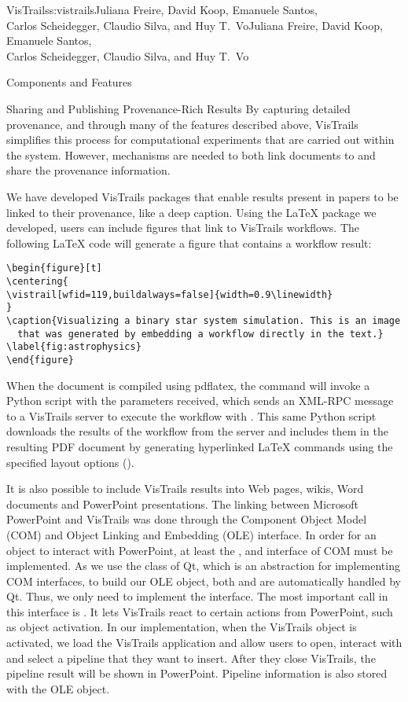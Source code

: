 \begin{aosachaptertoc}{VisTrails}{s:vistrails}{Juliana Freire, David Koop, Emanuele Santos, \\ Carlos Scheidegger, Claudio Silva, and Huy T.\ Vo}{Juliana Freire, David Koop, Emanuele Santos, \\ \hspace*{0.9cm} Carlos Scheidegger, Claudio Silva, and Huy T.\ Vo}
\begin{aosasect1}{Components and Features}
\begin{aosasect2}{Sharing and Publishing Provenance-Rich Results}
By capturing detailed provenance, and through many of the features
described above, VisTrails simplifies this process for computational
experiments that are carried out within the system. However,
mechanisms are needed to both link documents to and share the
provenance information.

We have developed VisTrails packages that enable results present in
papers to be linked to their provenance, like a deep caption. Using
the LaTeX package we developed, users can include figures that link to
VisTrails workflows.  The following LaTeX code will generate a figure
that contains a workflow result:

\begin{verbatim}
\begin{figure}[t]
\centering{
\vistrail[wfid=119,buildalways=false]{width=0.9\linewidth}
}
\caption{Visualizing a binary star system simulation. This is an image
  that was generated by embedding a workflow directly in the text.}
\label{fig:astrophysics}
\end{figure}
\end{verbatim}

When the document is compiled using pdflatex, the
 command will invoke a Python script
with the parameters received, which sends an XML-RPC message to a
VisTrails server to execute the workflow with . This same
Python script downloads the results of the workflow from the server
and includes them in the resulting PDF document by generating
hyperlinked LaTeX  commands
using the specified layout options
().

It is also possible to include VisTrails results into Web pages,
wikis, Word documents and PowerPoint presentations. The linking
between Microsoft PowerPoint and VisTrails was done through the
Component Object Model (COM) and Object Linking and Embedding (OLE)
interface. In order for an object to interact with PowerPoint, at
least the ,  and
 interface of COM must be implemented. As we use
the  class of Qt, which is an abstraction for
implementing COM interfaces, to build our OLE object, both
 and  are automatically
handled by Qt. Thus, we only need to implement the 
interface. The most important call in this interface is
. It lets VisTrails react to certain actions from
PowerPoint, such as object activation. In our implementation, when the
VisTrails object is activated, we load the VisTrails application and
allow users to open, interact with and select a pipeline that they
want to insert. After they close VisTrails, the pipeline result will
be shown in PowerPoint. Pipeline information is also stored with the
OLE object.


\end{aosasect2}
\end{aosasect1}
\end{aosachaptertoc}

